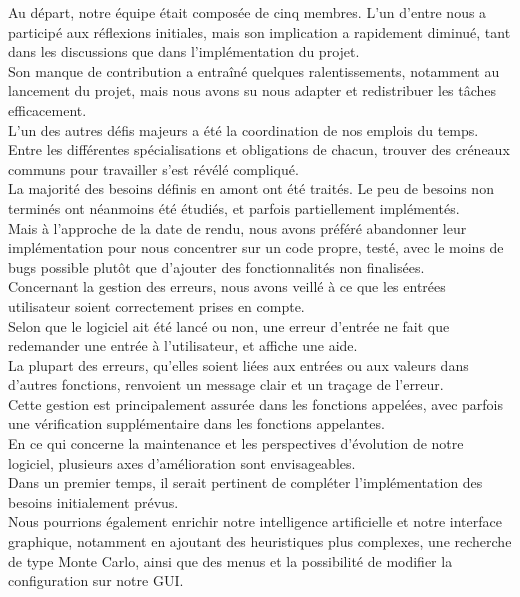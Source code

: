 \documentclass[a4paper,12pt]{article}
\begin{document}
Au départ, notre équipe était composée de cinq membres. L’un d’entre nous a
participé aux réflexions initiales, mais son implication a rapidement diminué,
tant dans les discussions que dans l’implémentation du projet.\\ Son manque de
contribution a entraîné quelques ralentissements, notamment au lancement du
projet, mais nous avons su nous adapter et redistribuer les tâches
efficacement.\\ L’un des autres défis majeurs a été la coordination de nos
emplois du temps.\\ Entre les différentes spécialisations et obligations de
chacun, trouver des créneaux communs pour travailler s’est révélé compliqué.\\

La majorité des besoins définis en amont ont été traités. Le peu de besoins non
terminés ont néanmoins été étudiés, et parfois partiellement implémentés.\\
Mais à l’approche de la date de rendu, nous avons préféré abandonner leur
implémentation pour nous concentrer sur un code propre, testé, avec le moins de
bugs possible plutôt que d’ajouter des fonctionnalités non finalisées.\\

Concernant la gestion des erreurs, nous avons veillé à ce que les entrées
utilisateur soient correctement prises en compte.\\ Selon que le logiciel ait
été lancé ou non, une erreur d’entrée ne fait que redemander une entrée à
l’utilisateur, et affiche une aide.\\ La plupart des erreurs, qu’elles soient
liées aux entrées ou aux valeurs dans d’autres fonctions, renvoient un message
clair et un traçage de l’erreur.\\ Cette gestion est principalement assurée
dans les fonctions appelées, avec parfois une vérification supplémentaire dans
les fonctions appelantes.\\

En ce qui concerne la maintenance et les perspectives d’évolution de notre
logiciel, plusieurs axes d’amélioration sont envisageables.\\ Dans un premier
temps, il serait pertinent de compléter l’implémentation des besoins
initialement prévus.\\ Nous pourrions également enrichir notre intelligence
artificielle et notre interface graphique, notamment en ajoutant des
heuristiques plus complexes, une recherche de type Monte Carlo, ainsi que des
menus et la possibilité de modifier la configuration sur notre GUI.\\
\end{document}
